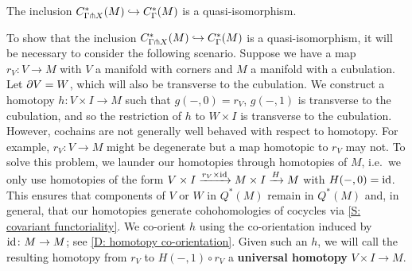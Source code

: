 \begin{theorem}\label{T: transverse complex}
The inclusion $C^*_{\Gamma \pitchfork X}(M) \hookrightarrow C^*_\Gamma(M)$ is a quasi-isomorphism.
\end{theorem}


To show that the inclusion $C^*_{\Gamma \pitchfork X}(M) \hookrightarrow C^*_\Gamma(M)$ is a quasi-isomorphism, it will be necessary to consider the following scenario. Suppose we have a map $r_V \colon V \to M$ with $V$ a manifold with corners and $M$ a manifold with a cubulation. Let $\partial V = W$, which will also be transverse to the cubulation. We construct a homotopy $h \colon V \times I \to M$ such that $g(-,0) = r_V$, $g(-,1)$ is transverse to the cubulation, and so the restriction of $h$ to $W \times I$ is transverse to the cubulation.
However, cochains are not generally well behaved with respect to homotopy. For example, $r_V \colon V \to M$ might be degenerate but a map homotopic to $r_V$ may not. To solve this problem, we launder our homotopies through homotopies of $M$, i.e.\ we only use homotopies of the form $V \times I \xrightarrow{r_V \times \mathrm{id}} M \times I \xrightarrow{H} M$ with $H(-,0) = \mathrm{id}$. This ensures that components of $V$ or $W$ in $Q^*(M)$ remain in $Q^*(M)$ and, in general, that our homotopies generate cohohomologies of cocycles via
\cref{S: covariant functoriality}. We co-orient $h$ using the co-orientation induced by $\mathrm{id} \colon M \to M$; see \cref{D: homotopy co-orientation}. Given such an $h$, we will call the resulting homotopy from $r_V$ to $H(-,1) \circ r_V$ a \textbf{universal homotopy} $V \times I \to M$.


